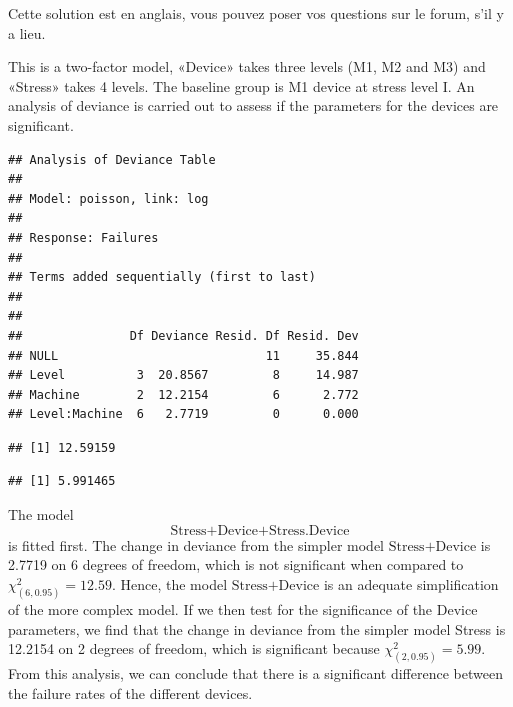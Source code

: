 \begin{solution}{2.7}
Cette solution est en anglais, vous pouvez poser vos questions sur le forum, s'il y a lieu.

This is a two-factor model, «Device» takes three levels (M1, M2 and M3) and «Stress» takes 4 levels. The baseline group is M1 device at stress level I. An analysis of deviance is carried out to assess if the parameters for the devices are significant.

\begin{knitrout}
\color{fgcolor}\begin{kframe}
\begin{alltt}
 \hlkwb{<-} \hlopt{~}\hlopt{*}
\end{alltt}
\begin{verbatim}
## Analysis of Deviance Table
##
## Model: poisson, link: log
##
## Response: Failures
##
## Terms added sequentially (first to last)
##
##
##               Df Deviance Resid. Df Resid. Dev
## NULL                             11     35.844
## Level          3  20.8567         8     14.987
## Machine        2  12.2154         6      2.772
## Level:Machine  6   2.7719         0      0.000
\end{verbatim}
\begin{alltt}
\hlstd{(}\hlstd{,} \hlstd{)}
\end{alltt}
\begin{verbatim}
## [1] 12.59159
\end{verbatim}
\begin{alltt}
\hlstd{(}\hlstd{,} \hlstd{)}
\end{alltt}
\begin{verbatim}
## [1] 5.991465
\end{verbatim}
\end{kframe}
\end{knitrout}

The model $$\mbox{Stress+Device+Stress.Device}$$ is fitted first. The change in deviance from the simpler model $\mbox{Stress+Device}$ is 2.7719 on 6 degrees of freedom, which is not significant when compared to $\chi^{2}_{(6,0.95)}=12.59$. Hence, the model $\mbox{Stress+Device}$ is an adequate simplification of the more complex model. If we then test for the significance of the Device parameters, we find that the change in deviance from the simpler model Stress is 12.2154 on 2 degrees of freedom, which is significant because $\chi^{2}_{(2,0.95)}=5.99$. From this analysis, we can conclude that there is a significant difference between the failure rates of the different devices.
\end{solution}
